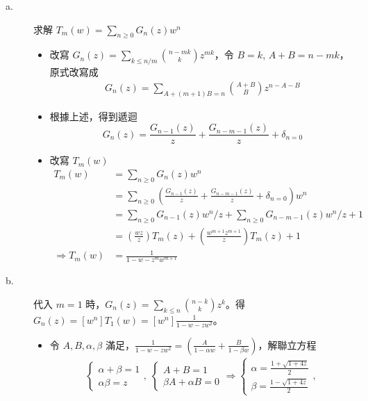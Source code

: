 \documentclass[11pt,fleqn]{article}
\begin{document}
\begin{description}
	\item[a.] 求解 $T_m(w) = \sum_{n \ge 0} G_n(z)w^n$
		\begin{itemize}
			\item 改寫 $G_n(z) = \sum_{k \le n/m} \binom{n-mk}{k} z^{mk}$，令 $B=k$, $A+B = n-mk$，原式改寫成
				\begin{align*}
					G_n(z) = \sum_{A+(m+1)B=n} \binom{A+B}{B} z^{n-A-B}
				\end{align*}
			\item 根據上述，得到遞迴 
				$$G_n(z) = \frac{G_{n-1}(z)}{z} + \frac{G_{n-m-1}(z)}{z} + \delta_{n=0}$$
			\item 改寫 $T_m(w)$
				\begin{align*}
					T_m(w) &= \sum_{n \ge 0} G_n(z) w^n \\
						&= \sum_{n \ge 0} \left( \frac{G_{n-1}(z)}{z} + 
							\frac{G_{n-m-1}(z)}{z} + \delta_{n=0} \right) w^n \\
						&= \sum_{n \ge 0} G_{n-1}(z) w^n / z
							+ \sum_{n \ge 0} G_{n-m-1}(z) w^n / z + 1 \\
						&= \left(\frac{wz}{z}\right) T_m(z) + 
							\left(\frac{w^{m+1} z^{m+1}}{z}\right) T_m(z) + 1 \\
					\Rightarrow T_m(w) &= \frac{1}{1 - w - z^m w^{m+1}}
				\end{align*}
		\end{itemize}
\newpage
	\item[b.] 代入 $m=1$ 時，$G_n(z) = \sum_{k \le n} \binom{n-k}{k} z^{k}$。得
			$G_n(z) = [w^n] T_1(w) = [w^n] \frac{1}{1-w-zw^2}$。
		\begin{itemize}
			\item
		令 $A, B, \alpha, \beta$ 滿足，$\frac{1}{1-w-zw^2} = \left( \frac{A}{1-\alpha w} + \frac{B}{1-\beta w} \right)$，解聯立方程
		\begin{align*}
			\left\{\begin{matrix}
\alpha + \beta = 1\\ 
\alpha \beta = z 
\end{matrix}\right. ,\;
\left\{\begin{matrix}
A+B = 1 \\
\beta A + \alpha B = 0
\end{matrix}\right. \Rightarrow
\left\{\begin{matrix}
\alpha = \frac{1+\sqrt{1+4z}}{2} \\ 
\beta = \frac{1-\sqrt{1+4z}}{2}
\end{matrix}\right. ,\;

\end{align*}
\end{itemize}
\end{description}
\end{document}

